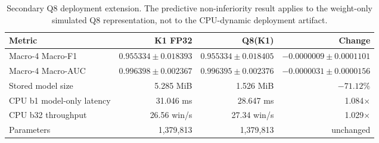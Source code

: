 \begin{table}[t]
\centering
\caption{Secondary Q8 deployment extension. The predictive non-inferiority result applies to the weight-only simulated Q8 representation, not to the CPU-dynamic deployment artifact.}
\label{tab:q8}
\small
\begin{tabular}{lrrr}
\toprule
Metric & K1 FP32 & Q8(K1) & Change \\
\midrule
Macro-4 Macro-F1 & $0.955334 \pm 0.018393$ & $0.955334 \pm 0.018405$ & $-0.0000009 \pm 0.0001101$ \\
Macro-4 Macro-AUC & $0.996398 \pm 0.002367$ & $0.996395 \pm 0.002376$ & $-0.0000031 \pm 0.0000156$ \\
Stored model size & 5.285 MiB & 1.526 MiB & $-71.12\%$ \\
CPU b1 model-only latency & 31.046 ms & 28.647 ms & 1.084$\times$ \\
CPU b32 throughput & 26.56 win/s & 27.34 win/s & 1.029$\times$ \\
Parameters & 1,379,813 & 1,379,813 & unchanged \\
\bottomrule
\end{tabular}
\end{table}
